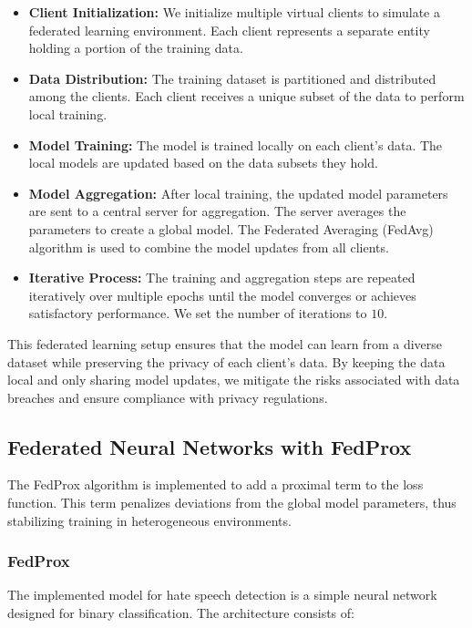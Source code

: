 \documentclass[11pt]{article}
\begin{document}
\begin{itemize}
    \item \textbf{Client Initialization:} We initialize multiple virtual clients to simulate a federated learning environment. Each client represents a separate entity holding a portion of the training data. 
    \item \textbf{Data Distribution:} The training dataset is partitioned and distributed among the clients. Each client receives a unique subset of the data to perform local training.
    \item \textbf{Model Training:} The model is trained locally on each client's data. The local models are updated based on the data subsets they hold.
    \item \textbf{Model Aggregation:} After local training, the updated model parameters are sent to a central server for aggregation. The server averages the parameters to create a global model. The Federated Averaging (FedAvg) algorithm is used to combine the model updates from all clients. 
    \item \textbf{Iterative Process:} The training and aggregation steps are repeated iteratively over multiple epochs until the model converges or achieves satisfactory performance. We set the number of iterations to $10$.
\end{itemize}

This federated learning setup ensures that the model can learn from a diverse dataset while preserving the privacy of each client's data. By keeping the data local and only sharing model updates, we mitigate the risks associated with data breaches and ensure compliance with privacy regulations.

\subsection{Federated Neural Networks with FedProx}

The FedProx algorithm is implemented to add a proximal term to the loss function. This term penalizes deviations from the global model parameters, thus stabilizing training in heterogeneous environments.

\subsubsection{FedProx}

The implemented model for hate speech detection is a simple neural network designed for binary classification. The architecture consists of:
\end{document}
